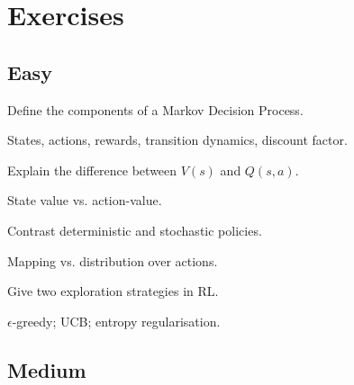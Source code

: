 
\section*{Exercises}

\subsection*{Easy}

\begin{exercisebox}[easy]
\begin{problem}
Define the components of a Markov Decision Process.
\end{problem}
\begin{hintbox}
States, actions, rewards, transition dynamics, discount factor.
\end{hintbox}
\end{exercisebox}


\begin{exercisebox}[easy]
\begin{problem}
Explain the difference between $V(s)$ and $Q(s,a)$.
\end{problem}
\begin{hintbox}
State value vs. action-value.
\end{hintbox}
\end{exercisebox}


\begin{exercisebox}[easy]
\begin{problem}
Contrast deterministic and stochastic policies.
\end{problem}
\begin{hintbox}
Mapping vs. distribution over actions.
\end{hintbox}
\end{exercisebox}


\begin{exercisebox}[easy]
\begin{problem}
Give two exploration strategies in RL.
\end{problem}
\begin{hintbox}
$\epsilon$-greedy; UCB; entropy regularisation.
\end{hintbox}
\end{exercisebox}


\subsection*{Medium}

